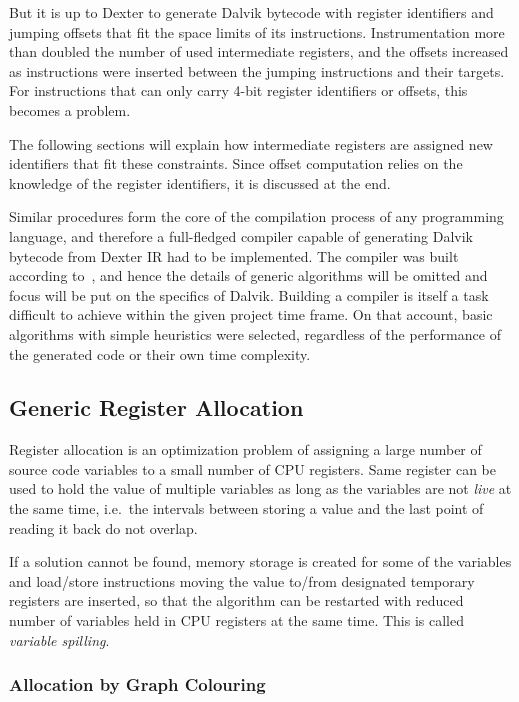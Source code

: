 \documentclass[12pt,twoside,notitlepage]{report}
\begin{document}
But it is up to Dexter to generate Dalvik bytecode with register identifiers and jumping offsets that fit the space limits of its instructions. Instrumentation more than doubled the number of used intermediate registers, and the offsets increased as instructions were inserted between the jumping instructions and their targets. For instructions that can only carry 4-bit register identifiers or offsets, this becomes a problem.

The following sections will explain how intermediate registers are assigned new identifiers that fit these constraints. Since offset computation relies on the knowledge of the register identifiers, it is discussed at the end.

Similar procedures form the core of the compilation process of any programming language, and therefore a full-fledged compiler capable of generating Dalvik bytecode from Dexter IR had to be implemented. The compiler was built according to~\cite{Appel:2003:MCI:599718}, and hence the details of generic algorithms will be omitted and focus will be put on the specifics of Dalvik. Building a compiler is itself a task difficult to achieve within the given project time frame. On that account, basic algorithms with simple heuristics were selected, regardless of the performance of the generated code or their own time complexity.

\subsection{Generic Register Allocation}

Register allocation is an optimization problem of assigning a large number of source code variables to a small number of CPU registers. Same register can be used to hold the value of multiple variables as long as the variables are not \emph{live} at the same time, i.e.\ the intervals between storing a value and the last point of reading it back do not overlap. 

If a solution cannot be found, memory storage is created for some of the variables and load/store instructions moving the value to/from designated temporary registers are inserted, so that the algorithm can be restarted with reduced number of variables held in CPU registers at the same time. This is called \emph{variable spilling}.

\subsubsection{Allocation by Graph Colouring}
\end{document}
